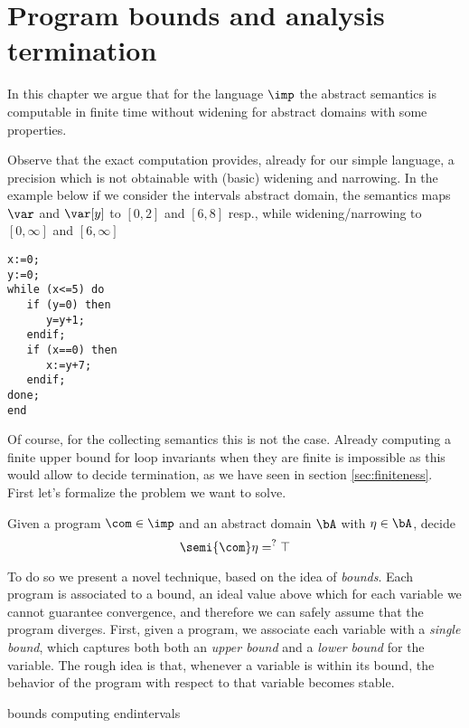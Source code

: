 \chapter{Program bounds and analysis termination}
\label{chap:axiomatized}


In this chapter we argue that for the language \(\imp\) the abstract
semantics is computable in finite time without widening for abstract
domains with some properties.

Observe that the exact computation provides, already for our simple
language, a precision which is not obtainable with (basic) widening
and narrowing. In the example below if we consider the intervals
abstract domain, the semantics maps \(\var\) and \(\var[y]\) to
\([0,2]\) and \([6,8]\) resp., while widening/narrowing to
\([0,\infty]\) and \([6,\infty]\)

\begin{verbatim}
x:=0;
y:=0;
while (x<=5) do
   if (y=0) then
      y=y+1;
   endif;
   if (x==0) then
      x:=y+7;
   endif;
done;
end
\end{verbatim}

Of course, for the collecting semantics this is not the case. Already
computing a finite upper bound for loop invariants when they are
finite is impossible as this would allow to decide termination, as we
have seen in section \ref{sec:finiteness}. First let's formalize the
problem we want to solve.

\begin{problem}\label{problem1}
  Given a program \(\com\in \imp\) and an abstract domain \(\bA\) with
  \(\eta \in \bA\), decide
  \begin{equation*}
    \semi{\com} \eta =^? \top
  \end{equation*}
\end{problem}

To do so we present a novel technique, based on the idea of
\emph{bounds}. Each program is associated to a bound, an ideal value
above which for each variable we cannot guarantee convergence, and
therefore we can safely assume that the program diverges.  First,
given a program, we associate each variable with a \emph{single
  bound}, which captures both both an \emph{upper bound} and a
\emph{lower bound} for the variable. The rough idea is that, whenever
a variable is within its bound, the behavior of the program with
respect to that variable becomes stable. %

{bounds}
{computing}
{endintervals}